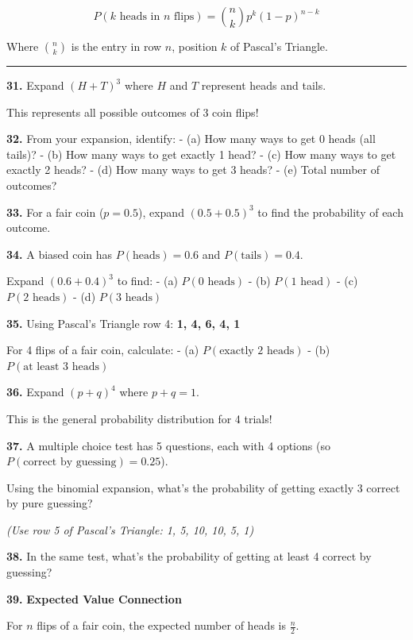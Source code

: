 \documentclass[
  11pt,
]{article}
\begin{document}
\[P(k \text{ heads in } n \text{ flips}) = \binom{n}{k} p^k (1-p)^{n-k}\]

Where \(\binom{n}{k}\) is the entry in row \(n\), position \(k\) of
Pascal's Triangle.

\begin{center}\rule{0.5\linewidth}{0.5pt}\end{center}

\textbf{31.} Expand \((H + T)^3\) where \(H\) and \(T\) represent heads
and tails.

This represents all possible outcomes of 3 coin flips!

\textbf{32.} From your expansion, identify: - (a) How many ways to get 0
heads (all tails)? - (b) How many ways to get exactly 1 head? - (c) How
many ways to get exactly 2 heads? - (d) How many ways to get 3 heads? -
(e) Total number of outcomes?

\textbf{33.} For a fair coin (\(p = 0.5\)), expand \((0.5 + 0.5)^3\) to
find the probability of each outcome.

\textbf{34.} A biased coin has \(P(\text{heads}) = 0.6\) and
\(P(\text{tails}) = 0.4\).

Expand \((0.6 + 0.4)^3\) to find: - (a) \(P(\text{0 heads})\) - (b)
\(P(\text{1 head})\) - (c) \(P(\text{2 heads})\) - (d)
\(P(\text{3 heads})\)

\textbf{35.} Using Pascal's Triangle row 4: \textbf{1, 4, 6, 4, 1}

For 4 flips of a fair coin, calculate: - (a)
\(P(\text{exactly 2 heads})\) - (b) \(P(\text{at least 3 heads})\)

\textbf{36.} Expand \((p + q)^4\) where \(p + q = 1\).

This is the general probability distribution for 4 trials!

\textbf{37.} A multiple choice test has 5 questions, each with 4 options
(so \(P(\text{correct by guessing}) = 0.25\)).

Using the binomial expansion, what's the probability of getting exactly
3 correct by pure guessing?

\emph{(Use row 5 of Pascal's Triangle: 1, 5, 10, 10, 5, 1)}

\textbf{38.} In the same test, what's the probability of getting at
least 4 correct by guessing?

\textbf{39.} \textbf{Expected Value Connection}

For \(n\) flips of a fair coin, the expected number of heads is
\(\frac{n}{2}\).
\end{document}
